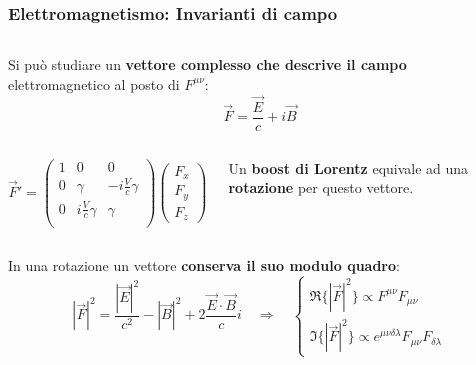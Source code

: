 \documentclass{beamer}
\begin{document}
\begin{frame}
    \frametitle{Elettromagnetismo: Invarianti di campo}
    \begin{columns}
         Si può studiare un \textbf{vettore complesso che descrive il campo} elettromagnetico al posto di $F^{\mu\nu}$: 
        $$\boxed{\vec F=\frac{\vec E}{c}+i\vec B}$$
    \end{columns}
    \begin{columns}
    \begin{equation*}
        \vec F'=\begin{pmatrix}
            1&0&0\\
            0&\gamma&-i\frac{V}{c}\gamma\\
            0&i\frac{V}{c}\gamma&\gamma\\
        \end{pmatrix}
        \begin{pmatrix}
            F_x\\F_y\\F_z
        \end{pmatrix}
    \end{equation*}

    Un \textbf{boost di Lorentz} equivale ad una \textbf{rotazione} per questo vettore.
    \end{columns}
    \vspace*{5mm}
    In una rotazione un vettore \textbf{conserva il suo modulo quadro}:
    \begin{equation*}
        |\vec F|^2=\frac{|\vec E|^2}{c^2}-|\vec B|^2+2\frac{\vec E\cdot \vec B}{c}i\quad \Rightarrow \quad \begin{cases}
            \Re\{|\vec F|^2\}\propto F^{\mu\nu}F_{\mu\nu}\\\Im\{|\vec F|^2\}\propto e^{\mu\nu\delta\lambda}F_{\mu\nu}F_{\delta \lambda}
        \end{cases}
    \end{equation*}

\end{frame}
\end{document}
